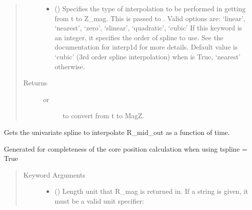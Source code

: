 \documentclass[letterpaper,10pt,english]{sphinxmanual}
\begin{document}
\begin{fulllineitems}
\begin{fulllineitems}
\begin{quote}
\begin{description}
\begin{itemize}
\item {} 
 () \textendash{} Specifies the type of interpolation to be performed in getting
from t to Z\_mag. This is passed to
. Valid options are:
‘linear’, ‘nearest’, ‘zero’, ‘slinear’, ‘quadratic’, ‘cubic’
If this keyword is an integer, it specifies the order of spline
to use. See the documentation for interp1d for more details.
Default value is ‘cubic’ (3rd order spline interpolation) when
 is True, ‘nearest’ otherwise.

\end{itemize}

\item[{Returns}] \leavevmode
\begin{description}
\item[{ or}] \leavevmode
{} to convert from t to MagZ.

\end{description}


\end{description}\end{quote}

\end{fulllineitems}


\begin{fulllineitems}
\label{\detokenize{eqtools:eqtools.core.Equilibrium.getRmidOutSpline}}
Gets the univariate spline to interpolate R\_mid\_out as a function of time.

Generated for completeness of the core position calculation when using
tspline = True
\begin{quote}\begin{description}
\item[{Keyword Arguments}] \leavevmode\begin{itemize}
\item {} 
 () \textendash{} 
Length unit that R\_mag is returned in. If
a string is given, it must be a valid unit specifier:
\begin{quote}



\end{quote}
\end{itemize}
\end{description}
\end{quote}
\end{fulllineitems}
\end{fulllineitems}
\end{document}
